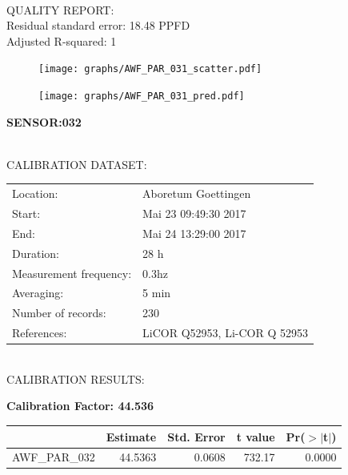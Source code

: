 \documentclass[oneside]{report}
\begin{document}
\hrulefill\\
QUALITY REPORT:\\
Residual standard error: 18.48 PPFD\\
Adjusted R-squared: 1



\begin{figure}[H]
  \centering
  \texttt{[image: graphs/AWF\_PAR\_031\_scatter.pdf]}
\end{figure}




\begin{figure}[H]
  \centering
  \texttt{[image: graphs/AWF\_PAR\_031\_pred.pdf]}
\end{figure}

\pagebreak


\begin{center}
\large{\textbf{SENSOR:032}}\\
\end{center}

\hrulefill\\
CALIBRATION DATASET:\\
\begin{table}[h!]
  \centering
  \label{tab:table1}
  \begin{tabular}{ll}
    Location: & Aboretum Goettingen\\ 
    
    
    Start:  & Mai 23 09:49:30 2017 \\
    End:   & Mai 24 13:29:00 2017\\ 
    Duration: & 28 h\\
    Measurement frequency: & 0.3hz\\
    Averaging:  &5 min\\
    Number of records: & 230 \\
    References: & LiCOR Q52953, Li-COR Q 52953 \\
  \end{tabular}
\end{table}

\hrulefill\\
CALIBRATION RESULTS:\\


\begin{center}
\textbf{\large{Calibration Factor: 44.536}}\\
\end{center}
\begin{table}[ht]
\centering
\begin{tabular}{rrrrr}
  \hline
 & Estimate & Std. Error & t value & Pr($>$$|$t$|$) \\ 
  \hline
AWF\_PAR\_032 & 44.5363 & 0.0608 & 732.17 & 0.0000 \\ 
   \hline
\end{tabular}
\end{table}
\end{document}
